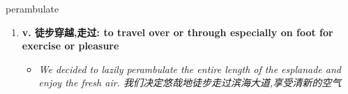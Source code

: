 
\begin{frame}
{\huge perambulate}
\begin{center}
\begin{enumerate}\Large
  \item \textbf{v. 徒步穿越,走过: to travel over or through especially on foot for exercise or pleasure}
  \begin{itemize}
    \item \em{\Large{We decided to lazily perambulate the entire length of the esplanade and enjoy the fresh air. 我们决定悠哉地徒步走过滨海大道,享受清新的空气}}
  \end{itemize}
\end{enumerate}
\end{center}
\end{frame}
